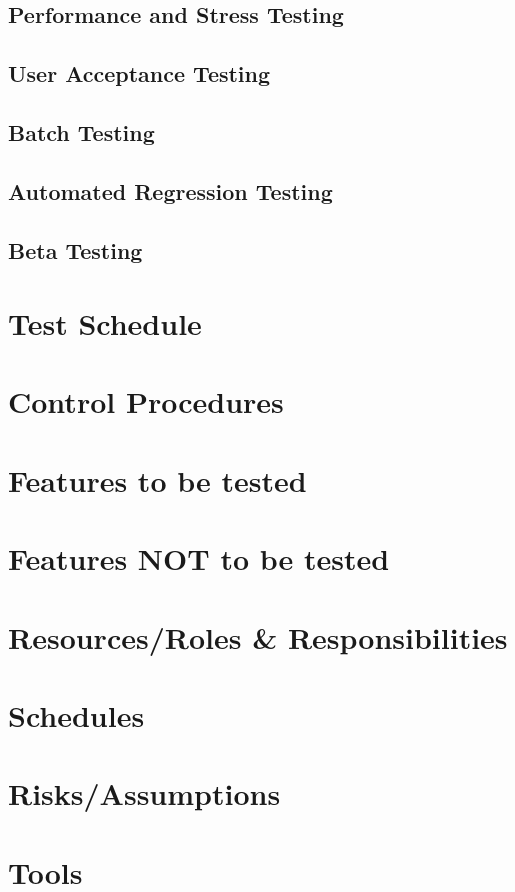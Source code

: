 \documentclass{article}
\begin{document}
    \subsection{Performance and Stress Testing}
    \subsection{User Acceptance Testing}
    \subsection{Batch Testing}
    \subsection{Automated Regression Testing}
    \subsection{Beta Testing}
\newpage

\section{Test Schedule}
\newpage

\section{Control Procedures}
\newpage

\section{Features to be tested}
\newpage

\section{Features NOT to be tested}
\newpage

\section{Resources/Roles \& Responsibilities}
\newpage

\section{Schedules}
\newpage

\section{Risks/Assumptions}
\newpage

\section{Tools}
\newpage
\end{document}
